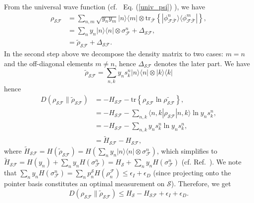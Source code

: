 \documentclass[a4paper,11pt,accepted=2024-09-14]{quantumarticle}
\newcommand\myeqref[1]{
	Eq. (\textup{\ref{#1}})
}
\newcommand{\ptr}[2]{\mathrm{tr_{#1}}\left\{#2\right\}}
\newcommand{\+}         {\dagger}
\newcommand{\tr}[1]{\mathrm{tr}\left\{#1\right\}}
\newcommand{\mc}[1]{\mathcal{#1}}
\begin{document}
From the universal wave function (cf.~\myeqref{univ_psi}), we have
\begin{equation}
\begin{split}
\rho_{\mc{SF}} &= \sum_{n,m} \sqrt{y_n y_m} |n\rangle \langle m| \otimes \ptr{\bar{\mc{F}}}{|\phi^{n}_{\mc{F}\bar{\mc{F}}}\rangle\langle\phi^{m}_{\mc{F}\bar{\mc{F}}}|},\\
&= \sum_{n} y_n |n\rangle \langle n| \otimes \sigma^n_{\mc{F}}+ \Delta_{\mc{SF}},\\
&= \tilde{\rho}_{\mc{SF}}+ \Delta_{\mc{SF}}.
\end{split}
\end{equation}
{In the second step above we decompose the density matrix to two cases: $m=n$ and the off-diagonal elements $m\neq n$, hence $\Delta_{\mc{SF}}$ denotes the later part}. We have
\begin{equation}
\tilde{\rho}_{\mc{SF}}= \sum_{n,k} y_n s^{n}_k |n\rangle \langle n| \otimes |k\rangle \langle k|
\end{equation}
hence
\begin{equation}
\begin{split}
D(\rho_{\mc{SF}}\| \tilde{\rho}_{\mc{SF}})&= -H_{\mc{SF}}-\tr{\rho_{\mc{SF}}\ln{\tilde{\rho_{\mc{SF}}}}},\\
&= -H_{\mc{SF}}- \sum_{n,k} \langle n,k | \rho_{\mc{SF}} |n,k \rangle \ln{y_n s^{n}_k},\\
&= -H_{\mc{SF}}- \sum_{n,k} y_n s^{n}_k \ln{y_n s^{n}_k},\\
&= \tilde{H}_{\mc{SF}}-H_{\mc{SF}},
\end{split}
\end{equation}
where $\tilde{H}_{\mc{SF}}= H(\tilde{\rho}_{\mc{SF}})=H(\sum_{n} y_n |n\rangle \langle n| \otimes \sigma^n_{\mc{F}})$, which simplifies to $\tilde{H}_{\mc{SF}}=H(y_n) + \sum_{n} y_{n} H(\sigma^n_{\mc{F}})= H_{\mc{S}}+ \sum_{n} y_{n} H(\sigma^n_{\mc{F}})$ (cf. Ref.~\cite{nielsen2002quantum}). We note that $\sum_{n} y_{n} H(\sigma^n_{\mc{F}})=\sum_{n}p^{\mc{S}}_n H(\rho^{\mc{F}}_n) \leq \epsilon_{I} + \epsilon_{D}$ (since projecting onto the pointer basis constitutes an optimal measurement on $\mc{S}$). Therefore, we get
\begin{equation}
D(\rho_{\mc{SF}}\| \tilde{\rho}_{\mc{SF}}) \leq H_{\mc{S}}-H_{\mc{SF}}+\epsilon_{I} + \epsilon_{D}.
\end{equation}
\end{document}
